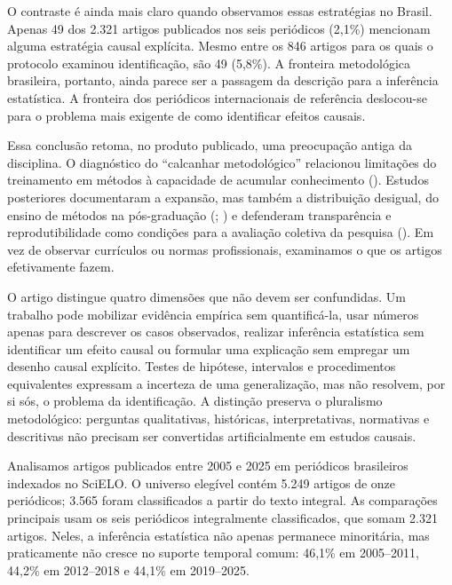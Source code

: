\documentclass[
]{article}
\begin{document}
O contraste é ainda mais claro quando observamos essas estratégias no
Brasil. Apenas 49 dos 2.321 artigos publicados nos seis periódicos
(2,1\%) mencionam alguma estratégia causal explícita. Mesmo entre os 846
artigos para os quais o protocolo examinou identificação, são 49
(5,8\%). A fronteira metodológica brasileira, portanto, ainda parece ser
a passagem da descrição para a inferência estatística. A fronteira dos
periódicos internacionais de referência deslocou-se para o problema mais
exigente de como identificar efeitos causais.

Essa conclusão retoma, no produto publicado, uma preocupação antiga da
disciplina. O diagnóstico do ``calcanhar metodológico'' relacionou
limitações do treinamento em métodos à capacidade de acumular
conhecimento (). Estudos posteriores
documentaram a expansão, mas também a distribuição desigual, do ensino
de métodos na pós-graduação (; ) e defenderam transparência e
reprodutibilidade como condições para a avaliação coletiva da pesquisa
(). Em vez de
observar currículos ou normas profissionais, examinamos o que os artigos
efetivamente fazem.

O artigo distingue quatro dimensões que não devem ser confundidas. Um
trabalho pode mobilizar evidência empírica sem quantificá-la, usar
números apenas para descrever os casos observados, realizar inferência
estatística sem identificar um efeito causal ou formular uma explicação
sem empregar um desenho causal explícito. Testes de hipótese, intervalos
e procedimentos equivalentes expressam a incerteza de uma generalização,
mas não resolvem, por si sós, o problema da identificação. A distinção
preserva o pluralismo metodológico: perguntas qualitativas, históricas,
interpretativas, normativas e descritivas não precisam ser convertidas
artificialmente em estudos causais.

Analisamos artigos publicados entre 2005 e 2025 em periódicos
brasileiros indexados no SciELO. O universo elegível contém 5.249
artigos de onze periódicos; 3.565 foram classificados a partir do texto
integral. As comparações principais usam os seis periódicos
integralmente classificados, que somam 2.321 artigos. Neles, a
inferência estatística não apenas permanece minoritária, mas
praticamente não cresce no suporte temporal comum: 46,1\% em 2005--2011,
44,2\% em 2012--2018 e 44,1\% em 2019--2025.
\end{document}
